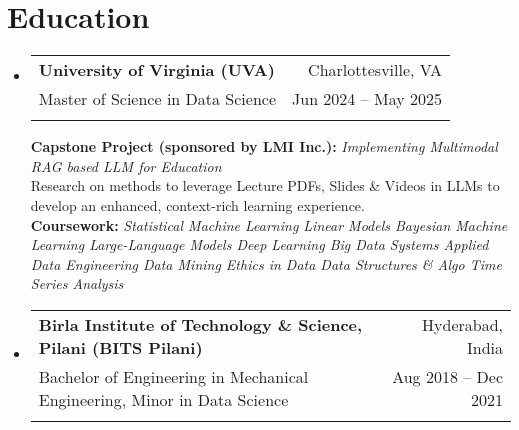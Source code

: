 \documentclass[letter paper,11pt]{article}
\makeatletter
\newcommand{\resumeSubheading}[5]{%
  \item
    \begin{tabular*}
    {1\textwidth}
    {l@{\extracolsep{\fill}}r}
      \textbf{#1} & \small#2 \\
      {\small#3} & {\small #4} \\
      {\small#5}
    \end{tabular*}%
  \vspace{-0.95cm}
}
\newcommand{\resumeSubHeadingListStart}{\begin{itemize}[leftmargin=0.0in, label={}]}
\newcommand{\resumeSubHeadingListEnd}{\end{itemize}}
\makeatother
\begin{document}
\section{\large{Education}}
    \resumeSubHeadingListStart
    
    \resumeSubheading
         {University of Virginia (UVA)}{Charlottesville, VA}
        {Master of Science in Data Science}{Jun 2024 -- May 2025}{}
        
        \vspace{9pt}
        
        \footnotesize{\textbf{Capstone Project (sponsored by LMI Inc.):} \textsl{Implementing Multimodal RAG based LLM for Education} \\
        {Research on methods to leverage Lecture PDFs, Slides \& Videos in LLMs to develop an enhanced, context-rich learning experience.
        }\\
        \vspace{2px}
        \textbf{Coursework:}
        \textsl{Statistical Machine Learning \textbullet{} 
        Linear Models \textbullet{} 
        Bayesian Machine Learning \textbullet{} 
        Large-Language Models \textbullet{}
        Deep Learning \textbullet{}
        Big Data Systems \textbullet{} 
        Applied Data Engineering \textbullet{}
        Data Mining \textbullet{} 
        Ethics in Data \textbullet{} 
        Data Structures \& Algo \textbullet{}
        Time Series Analysis
        }}

    
    \vspace{3pt}    
    \resumeSubheading
        {\small{Birla Institute of Technology \& Science, Pilani (BITS Pilani)}}{Hyderabad, India}
        {Bachelor of Engineering in Mechanical Engineering, Minor in Data Science}{Aug 2018 -- Dec 2021}{}
   

 \resumeSubHeadingListEnd 
%



 


\vspace{-12pt}
\end{document}
